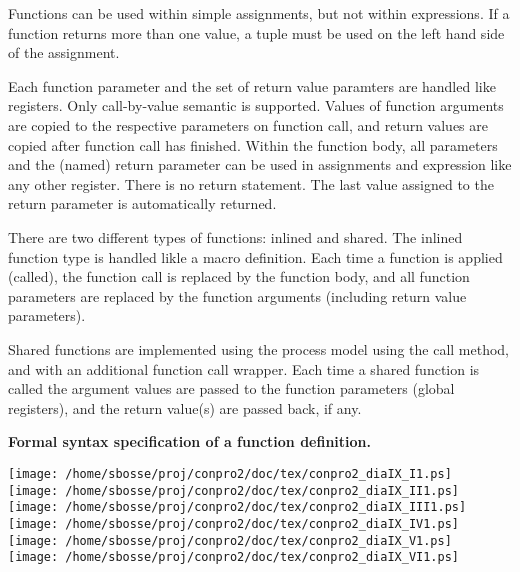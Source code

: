 \documentclass[a4paper,12pt,twoside,english]{article}
\begin{document}
\vskip5pt
Functions can be used within simple assignments, but not within expressions. If a function returns more than one value, a tuple must be used on the left hand
side of the assignment.


\vskip5pt
Each function parameter and the set of return value paramters are handled like registers. Only call-by-value semantic is supported. Values of function arguments
are copied to the respective parameters on function call, and return values are copied after function call has finished. Within the function body, all
parameters and the (named) return parameter can be used in assignments and expression like any other register. There is no return statement. The last value
assigned to the return parameter is automatically returned.


\vskip5pt
There are two different types of functions: inlined and shared. The inlined function type is handled likle a macro definition. Each time a function is applied
(called), the function call is replaced by the function body, and all function parameters are replaced by  the function arguments (including return value
parameters).


\vskip5pt
Shared functions are implemented using the process model using the call method, and with an additional function call wrapper. Each time a shared function is
called the argument values are passed to the function parameters (global registers), and the return value(s) are passed back, if any.


\vskip5pt
\def\defcontent{
\begin{center}
\texttt{[image: /home/sbosse/proj/conpro2/doc/tex/conpro2\_diaIX\_I1.ps]}\\\vskip3pt
\texttt{[image: /home/sbosse/proj/conpro2/doc/tex/conpro2\_diaIX\_II1.ps]}\\\vskip3pt
\texttt{[image: /home/sbosse/proj/conpro2/doc/tex/conpro2\_diaIX\_III1.ps]}\\\vskip3pt
\texttt{[image: /home/sbosse/proj/conpro2/doc/tex/conpro2\_diaIX\_IV1.ps]}\\\vskip3pt
\texttt{[image: /home/sbosse/proj/conpro2/doc/tex/conpro2\_diaIX\_V1.ps]}\\\vskip3pt
\texttt{[image: /home/sbosse/proj/conpro2/doc/tex/conpro2\_diaIX\_VI1.ps]}\\\vskip3pt
\end{center}
}
\def\defdescription{
\caption{\bf Formal syntax specification of  a function definition.
}
\label{def:9}}
\begin{definition}[H]\let\normalsize\footnotesize \normalsize
\defdescription
\end{definition}
\defcontent
\end{document}
